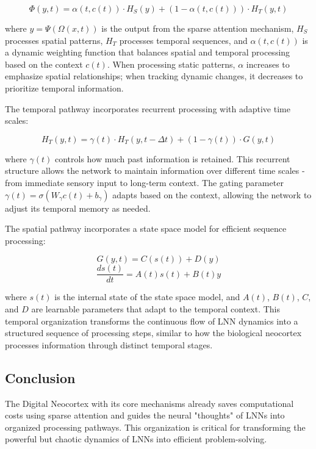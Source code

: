 \documentclass{article}
\begin{document}
\begin{equation}
\Phi(y, t) = \alpha(t, c(t)) \cdot H_S(y) + (1 - \alpha(t, c(t))) \cdot H_T(y, t)
\end{equation}

where $y = \Psi(\Omega(x, t))$ is the output from the sparse attention mechanism, $H_S$ processes spatial patterns, $H_T$ processes temporal sequences, and $\alpha(t, c(t))$ is a dynamic weighting function that balances spatial and temporal processing based on the context $c(t)$. When processing static patterns, $\alpha$ increases to emphasize spatial relationships; when tracking dynamic changes, it decreases to prioritize temporal information.

The temporal pathway incorporates recurrent processing with adaptive time scales:

\begin{equation}
H_T(y, t) = \gamma(t) \cdot H_T(y, t-\Delta t) + (1-\gamma(t)) \cdot G(y, t)
\end{equation}

where $\gamma(t)$ controls how much past information is retained. This recurrent structure allows the network to maintain information over different time scales - from immediate sensory input to long-term context. The gating parameter $\gamma(t) = \sigma(W_\gamma c(t) + b_\gamma)$ adapts based on the context, allowing the network to adjust its temporal memory as needed.

The spatial pathway incorporates a state space model for efficient sequence processing:

\begin{equation}
G(y, t) = C(s(t)) + D(y)
\end{equation}
\begin{equation}
\frac{ds(t)}{dt} = A(t)s(t) + B(t)y
\end{equation}

where $s(t)$ is the internal state of the state space model, and $A(t)$, $B(t)$, $C$, and $D$ are learnable parameters that adapt to the temporal context. This temporal organization transforms the continuous flow of LNN dynamics into a structured sequence of processing steps, similar to how the biological neocortex processes information through distinct temporal stages.

\subsection{Conclusion}
The Digital Neocortex with its core mechanisms already saves computational costs using sparse attention and guides the neural "thoughts" of LNNs into organized processing pathways. This organization is critical for transforming the powerful but chaotic dynamics of LNNs into efficient problem-solving.
\end{document}
